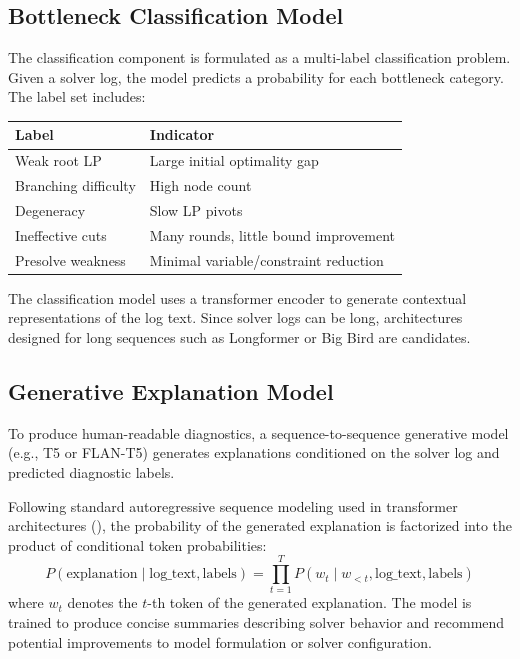\documentclass[11pt]{article}
\begin{document}
\subsection{Bottleneck Classification Model}

The classification component is formulated as a multi-label classification problem. Given a solver log, the model predicts a probability for each bottleneck category. 
The label set includes:

\begin{table}[h]
\centering
\begin{tabular}{ll}
\toprule
\textbf{Label} & \textbf{Indicator} \\
\midrule
Weak root LP & Large initial optimality gap \\
Branching difficulty & High node count \\
Degeneracy & Slow LP pivots \\
Ineffective cuts & Many rounds, little bound improvement \\
Presolve weakness & Minimal variable/constraint reduction \\
\bottomrule
\end{tabular}
\label{tab:labels}
\end{table}

The classification model uses a transformer encoder to generate contextual representations of the log text. Since solver logs can be long, architectures designed for long sequences such 
as Longformer \cite{beltagy2020longformer} or Big Bird \cite{zaheer2020bigbird} are candidates.

\subsection{Generative Explanation Model}

To produce human-readable diagnostics, a sequence-to-sequence generative model (e.g., T5 or FLAN-T5) generates explanations conditioned on the solver log and predicted diagnostic labels. 

Following standard autoregressive sequence modeling used in transformer architectures (\cite{raffel2020t5}), the probability of the generated explanation is factorized into the product of conditional token probabilities:
\begin{equation}
    P(\text{explanation} \mid \text{log\_text}, \text{labels}) = \prod_{t=1}^{T} P(w_t \mid w_{<t}, \text{log\_text}, \text{labels})
\end{equation}
where $w_t$ denotes the $t$-th token of the generated explanation. The model is trained to produce concise summaries describing solver behavior and recommend potential improvements to model 
formulation or solver configuration.
\end{document}
